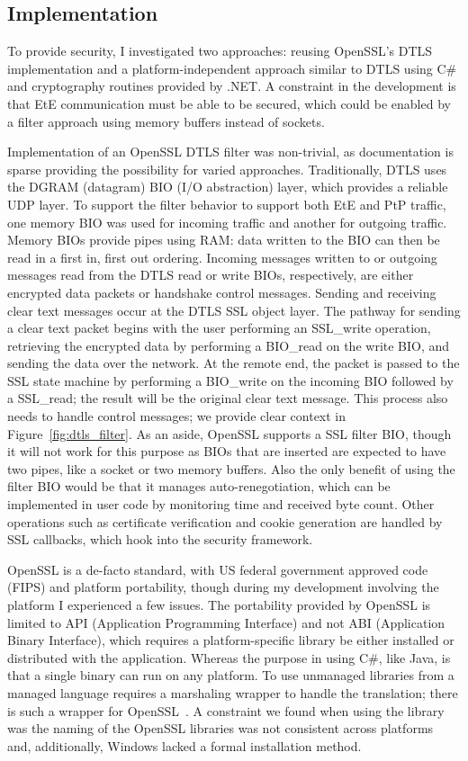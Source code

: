 \subsection{Implementation}
To provide security, I investigated two approaches:  reusing OpenSSL's DTLS
implementation and a platform-independent approach similar to DTLS using C\#
and cryptography routines provided by .NET.  A constraint in the development is
that EtE communication must be able to be secured, which could be enabled by a
filter approach using memory buffers instead of sockets.

Implementation of an OpenSSL DTLS filter was non-trivial, as documentation is
sparse providing the possibility for varied approaches.  Traditionally, DTLS
uses the DGRAM (datagram) BIO (I/O abstraction) layer, which provides a reliable
UDP layer.  To support the filter behavior to support both EtE and PtP traffic,
one memory BIO was used for incoming traffic and another for outgoing traffic.
Memory BIOs provide pipes using RAM: data written to the BIO can then be read
in a first in, first out ordering.  Incoming messages written to or outgoing
messages read from the DTLS read or write BIOs, respectively, are either
encrypted data packets or handshake control messages.  Sending and receiving
clear text messages occur at the DTLS SSL object layer.  The pathway for
sending a clear text packet begins with the user performing an SSL\_write
operation, retrieving the encrypted data by performing a BIO\_read on the write
BIO, and sending the data over the network.  At the remote end, the packet is
passed to the SSL state machine by performing a BIO\_write on the incoming BIO
followed by a SSL\_read; the result will be the original clear text message.
This process also needs to handle control messages; we provide clear context in
Figure~\ref{fig:dtls_filter}.  As an aside, OpenSSL supports a SSL filter
BIO, though it will not work for this purpose as BIOs that are inserted are
expected to have two pipes, like a socket or two memory buffers.  Also the only
benefit of using the filter BIO would be that it manages auto-renegotiation,
which can be implemented in user code by monitoring time and received byte
count.  Other operations such as certificate verification and cookie generation
are handled by SSL callbacks, which hook into the security framework.

OpenSSL is a de-facto standard, with US federal government approved code (FIPS)
and platform portability, though during my development involving the platform I
experienced a few issues.  The portability provided by OpenSSL is limited to
API (Application Programming Interface) and not ABI (Application Binary
Interface), which requires a platform-specific library be either installed or
distributed with the application.  Whereas the purpose in using C\#, like Java,
is that a single binary can run on any platform.  To use unmanaged libraries
from a managed language requires a marshaling wrapper to handle the
translation; there is such a wrapper for OpenSSL~\cite{openssl.net}.  A
constraint we found when using the library was the naming of the OpenSSL
libraries was not consistent across platforms and, additionally, Windows lacked
a formal installation method.

